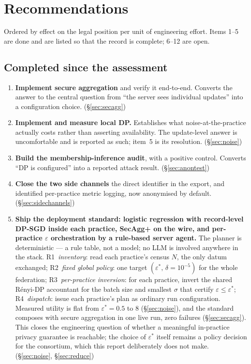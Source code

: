 \section{Recommendations}
\label{sec:recs}

Ordered by effect on the legal position per unit of engineering effort. Items 1--5 are done and are
listed so that the record is complete; 6--12 are open.

\subsection*{Completed since the assessment}

\begin{enumerate}
  \item \textbf{Implement secure aggregation} and verify it end-to-end. Converts the answer to the
        central question from ``the server sees individual updates'' into a configuration choice.
        (\S\ref{sec:secagg})
  \item \textbf{Implement and measure local DP.} Establishes what noise-at-the-practice actually
        costs rather than asserting availability. The update-level answer is uncomfortable and is
        reported as such; item~5 is its resolution. (\S\ref{sec:noise})
  \item \textbf{Build the membership-inference audit}, with a positive control. Converts ``DP is
        configured'' into a reported attack result. (\S\ref{sec:anontest})
  \item \textbf{Close the two side channels} the direct identifier in the export, and identified
        per-practice metric logging, now anonymised by default. (\S\ref{sec:sidechannels})
  \item \textbf{Ship the deployment standard: logistic regression with record-level DP-SGD inside
        each practice, SecAgg+ on the wire, and per-practice $\varepsilon$ orchestration by a
        rule-based server agent.} The planner is deterministic — a rule table, not a model; no LLM
        is involved anywhere in the stack. R1~\emph{inventory}: read each practice's census $N$,
        the only datum exchanged; R2~\emph{fixed global policy}: one target
        $(\varepsilon^{*},\, \delta = 10^{-5})$ for the whole federation; R3~\emph{per-practice
        inversion}: for each practice, invert the shared R\'enyi-DP accountant for the batch size
        and smallest $\sigma$ that certify $\varepsilon \le \varepsilon^{*}$; R4~\emph{dispatch}:
        issue each practice's plan as ordinary run configuration. Measured utility is flat from
        $\varepsilon^{*} = 0.5$ to $8$ (\S\ref{sec:noise}), and the standard composes with secure
        aggregation in one live run, zero failures (\S\ref{sec:secagg}). This closes the
        engineering question of whether a meaningful in-practice privacy guarantee is reachable;
        the choice of $\varepsilon^{*}$ itself remains a policy decision for the consortium, which
        this report deliberately does not make. (\S\ref{sec:noise}, \S\ref{sec:reduce})
\end{enumerate}

